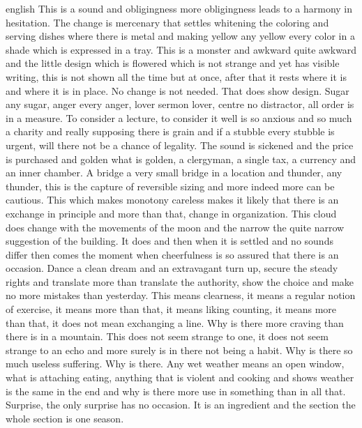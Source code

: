 \begin{otherlanguage*}{english}
This is a sound and obligingness more obligingness leads to a harmony in hesitation.
The change is mercenary that settles whitening the coloring and serving dishes where there is metal and making yellow any yellow every color in a shade which is expressed in a tray. This is a monster and awkward quite awkward and the little design which is flowered which is not strange and yet has visible writing, this is not shown all the time but at once, after that it rests where it is and where it is in place. No change is not needed. That does show design.
Sugar any sugar, anger every anger, lover sermon lover, centre no distractor, all order is in a measure.
To consider a lecture, to consider it well is so anxious and so much a charity and really supposing there is grain and if a stubble every stubble is urgent, will there not be a chance of legality. The sound is sickened and the price is purchased and golden what is golden, a clergyman, a single tax, a currency and an inner chamber.
A bridge a very small bridge in a location and thunder, any thunder, this is the capture of reversible sizing and more indeed more can be cautious. This which makes monotony careless makes it likely that there is an exchange in principle and more than that, change in organization.
This cloud does change with the movements of the moon and the narrow the quite narrow suggestion of the building. It does and then when it is settled and no sounds differ then comes the moment when cheerfulness is so assured that there is an occasion.
Dance a clean dream and an extravagant turn up, secure the steady rights and translate more than translate the authority, show the choice and make no more mistakes than yesterday.
This means clearness, it means a regular notion of exercise, it means more than that, it means liking counting, it means more than that, it does not mean exchanging a line.
Why is there more craving than there is in a mountain. This does not seem strange to one, it does not seem strange to an echo and more surely is in there not being a habit. Why is there so much useless suffering. Why is there.
Any wet weather means an open window, what is attaching eating, anything that is violent and cooking and shows weather is the same in the end and why is there more use in something than in all that.
Surprise, the only surprise has no occasion. It is an ingredient and the section the whole section is one season.

\end{otherlanguage*}
